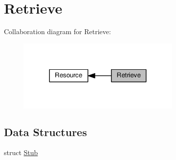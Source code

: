 \hypertarget{group__retrieve}{}\section{Retrieve}
\label{group__retrieve}
Collaboration diagram for Retrieve\+:\nopagebreak
\begin{figure}[H]
\begin{center}
\leavevmode
\includegraphics[width=228pt]{group__retrieve}
\end{center}
\end{figure}
\subsection*{Data Structures}
\begin{DoxyCompactItemize}
\item 
struct \hyperlink{structStub}{Stub}
\end{DoxyCompactItemize}

